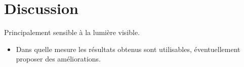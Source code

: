 \section{Discussion}







Principalement sensible à la lumière visible.



\begin{itemize}
\item Dans quelle mesure les résultats obtenus sont utilisables, éventuellement proposer des améliorations.
\end{itemize}